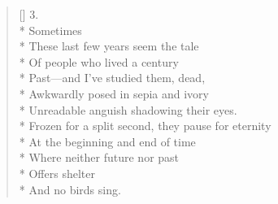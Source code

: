 \begin{verse}[\versewidth]
3.\\*
 \qquad  \qquad Sometimes\\*
These last few years seem the tale\\*
Of people who lived a century\\*
Past---and I've studied them, dead,\\*
Awkwardly posed in sepia and ivory\\*
Unreadable anguish shadowing their eyes.\\*
Frozen for a split second, they pause for eternity\\*
At the beginning and end of time\\*
Where neither future nor past\\*
Offers shelter\\*
And no birds sing.
\end{verse}
